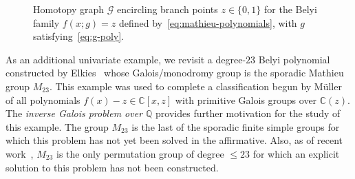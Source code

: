 \documentclass[11pt]{amsart}
\let\oldtextit\textit
\renewcommand\emph[1]{\oldtextit{\color{blue}#1}}
\theoremstyle{definition}
\theoremstyle{remark}
\newcommand{\CC}{{\mathbb C}}
\begin{document}
\begin{figure}[h]
\caption{Homotopy graph $\mathcal{G}$ encircling branch points $z\in \{ 0,1\}$ for the Belyi family $f(x;g)=z$ defined by~\eqref{eq:mathieu-polynomials}, with $g$ satisfying~\eqref{eq:g-poly}.}
\label{fig:mathieu-data}
\end{figure}

As an additional univariate example, we revisit a degree-$23$ Belyi polynomial constructed by Elkies~\cite{elkies2013complex} whose Galois/monodromy group is the sporadic Mathieu group $M_{23}.$
This example was used to complete a classification begun by M\"{u}ller~\cite{muller1995primitive} of all polynomials $f(x)-z\in \CC [x,z]$ with primitive Galois groups over $\mathbb{C}(z).$
The \emph{inverse Galois problem over $\mathbb{Q}$} provides further motivation for the study of this example. The group $M_{23}$ is the last of the sporadic finite simple groups for which this problem has not yet been solved in the affirmative. 
Also, as of recent work~\cite{van202417t7}, $M_{23}$ is the only permutation group of degree $\le 23$ for which an explicit solution to this problem has not been constructed.
\end{document}
